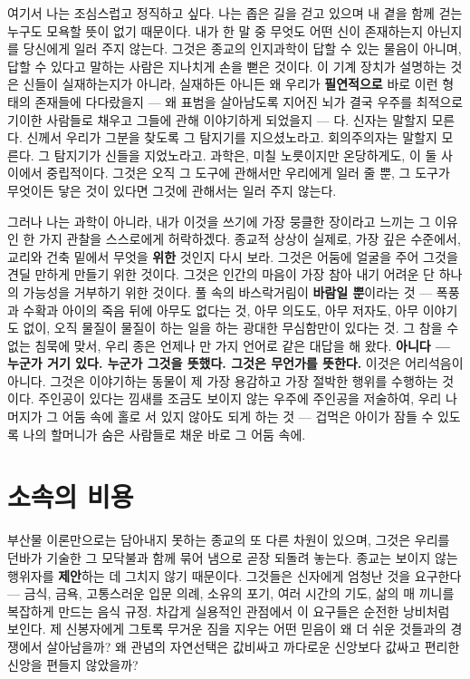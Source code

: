 여기서 나는 조심스럽고 정직하고 싶다. 나는 좁은 길을 걷고 있으며 내 곁을 함께 걷는 누구도 모욕할 뜻이 없기 때문이다. 내가 한 말 중 무엇도 어떤 신이 존재하는지 아닌지를 당신에게 일러 주지 않는다. 그것은 종교의 인지과학이 답할 수 있는 물음이 아니며, 답할 수 있다고 말하는 사람은 지나치게 손을 뻗은 것이다. 이 기계 장치가 설명하는 것은 신들이 실재하는지가 아니라, 실재하든 아니든 왜 우리가 \textbf{필연적으로} 바로 이런 형태의 존재들에 다다랐을지 — 왜 표범을 살아남도록 지어진 뇌가 결국 우주를 최적으로 기이한 사람들로 채우고 그들에 관해 이야기하게 되었을지 — 다. 신자는 말할지 모른다. 신께서 우리가 그분을 찾도록 그 탐지기를 지으셨노라고. 회의주의자는 말할지 모른다. 그 탐지기가 신들을 지었노라고. 과학은, 미칠 노릇이지만 온당하게도, 이 둘 사이에서 중립적이다. 그것은 오직 그 도구에 관해서만 우리에게 일러 줄 뿐, 그 도구가 무엇이든 닿은 것이 있다면 그것에 관해서는 일러 주지 않는다.

그러나 나는 과학이 아니라, 내가 이것을 쓰기에 가장 뭉클한 장이라고 느끼는 그 이유인 한 가지 관찰을 스스로에게 허락하겠다. 종교적 상상이 실제로, 가장 깊은 수준에서, 교리와 건축 밑에서 무엇을 \textbf{위한} 것인지 다시 보라. 그것은 어둠에 얼굴을 주어 그것을 견딜 만하게 만들기 위한 것이다. 그것은 인간의 마음이 가장 참아 내기 어려운 단 하나의 가능성을 거부하기 위한 것이다. 풀 속의 바스락거림이 \textbf{바람일 뿐}이라는 것 — 폭풍과 수확과 아이의 죽음 뒤에 아무도 없다는 것, 아무 의도도, 아무 저자도, 아무 이야기도 없이, 오직 물질이 물질이 하는 일을 하는 광대한 무심함만이 있다는 것. 그 참을 수 없는 침묵에 맞서, 우리 종은 언제나 만 가지 언어로 같은 대답을 해 왔다. \textbf{아니다 — 누군가 거기 있다. 누군가 그것을 뜻했다. 그것은 무언가를 뜻한다.} 이것은 어리석음이 아니다. 그것은 이야기하는 동물이 제 가장 용감하고 가장 절박한 행위를 수행하는 것이다. 주인공이 있다는 낌새를 조금도 보이지 않는 우주에 주인공을 저술하여, 우리 나머지가 그 어둠 속에 홀로 서 있지 않아도 되게 하는 것 — 겁먹은 아이가 잠들 수 있도록 나의 할머니가 숨은 사람들로 채운 바로 그 어둠 속에.

\section*{소속의 비용}

부산물 이론만으로는 담아내지 못하는 종교의 또 다른 차원이 있으며, 그것은 우리를 던바가 기술한 그 모닥불과 함께 묶어 냄으로 곧장 되돌려 놓는다. 종교는 보이지 않는 행위자를 \textbf{제안}하는 데 그치지 않기 때문이다. 그것들은 신자에게 엄청난 것을 요구한다 — 금식, 금욕, 고통스러운 입문 의례, 소유의 포기, 여러 시간의 기도, 삶의 매 끼니를 복잡하게 만드는 음식 규정. 차갑게 실용적인 관점에서 이 요구들은 순전한 낭비처럼 보인다. 제 신봉자에게 그토록 무거운 짐을 지우는 어떤 믿음이 왜 더 쉬운 것들과의 경쟁에서 살아남을까? 왜 관념의 자연선택은 값비싸고 까다로운 신앙보다 값싸고 편리한 신앙을 편들지 않았을까?


